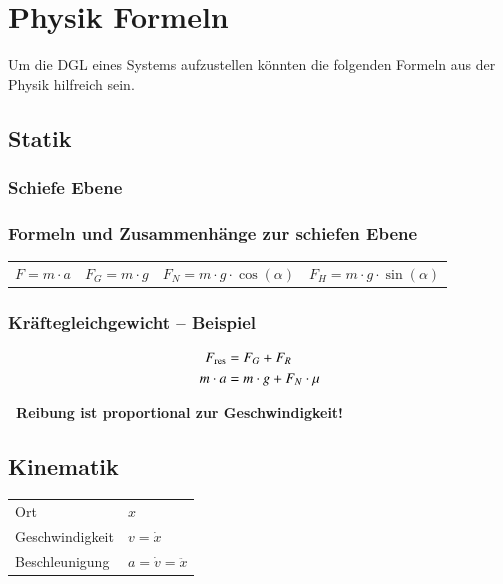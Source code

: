 \section{Physik Formeln}

Um die DGL eines Systems aufzustellen könnten die folgenden Formeln aus der Physik hilfreich sein.


\subsection{Statik}

\subsubsection{Schiefe Ebene}



\subsubsection*{Formeln und Zusammenhänge zur schiefen Ebene}

\begin{tabular}{llll}
	$F = m \cdot a$	& $F_G = m \cdot g$ &	$F_N = m \cdot g \cdot \cos(\alpha)$ &	$F_H = m \cdot g \cdot \sin(\alpha)$
\end{tabular}
	
	
\subsubsection{Kräftegleichgewicht -- Beispiel}

\begin{minipage}[c]{0.35\columnwidth}
	\begin{align*}
		F_{\rm res} &= F_G + F_R \\
		m \cdot a	&= m \cdot g + F_N \cdot \mu
	\end{align*}
\end{minipage}
\hfill
\begin{minipage}[c]{0.6\columnwidth}
	\textbf{ \textrightarrow\ Reibung ist proportional zur Geschwindigkeit!}
\end{minipage}


\subsection{Kinematik}

\renewcommand{\arraystretch}{1.1}
\begin{tabular}{ll}
	Ort 			& $x$ 						\\
	Geschwindigkeit & $v = \dot{x}$ 			\\
	Beschleunigung 	& $a = \dot{v} = \ddot{x}$
\end{tabular}
\renewcommand{\arraystretch}{1}


